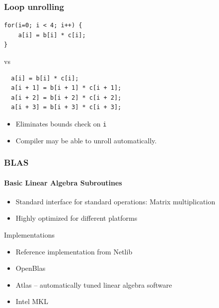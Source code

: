 \documentclass{beamer}
\begin{document}

\begin{frame}[fragile]
  \frametitle{Loop unrolling}
\begin{lstlisting}
for(i=0; i < 4; i++) {
    a[i] = b[i] * c[i];
}
\end{lstlisting}
vs
\begin{lstlisting}
  a[i] = b[i] * c[i];
  a[i + 1] = b[i + 1] * c[i + 1];
  a[i + 2] = b[i + 2] * c[i + 2];
  a[i + 3] = b[i + 3] * c[i + 3];
\end{lstlisting}
\begin{itemize}
\item Eliminates bounds check on \texttt{i}
\item Compiler may be able to unroll automatically.
\end{itemize}
\end{frame}

\begin{frame}
  \frametitle{BLAS}
  \framesubtitle{Basic Linear Algebra Subroutines}
  \begin{itemize}
  \item Standard interface for standard operations:
    Matrix multiplication
  \item Highly optimized for different platforms
  \end{itemize}
  \begin{block}{Implementations}
    \begin{itemize}
    \item Reference implementation from Netlib
    \item OpenBlas
    \item Atlas -- automatically tuned linear algebra software
    \item Intel MKL
    \end{itemize}
  \end{block}
\end{frame}

\end{document}
